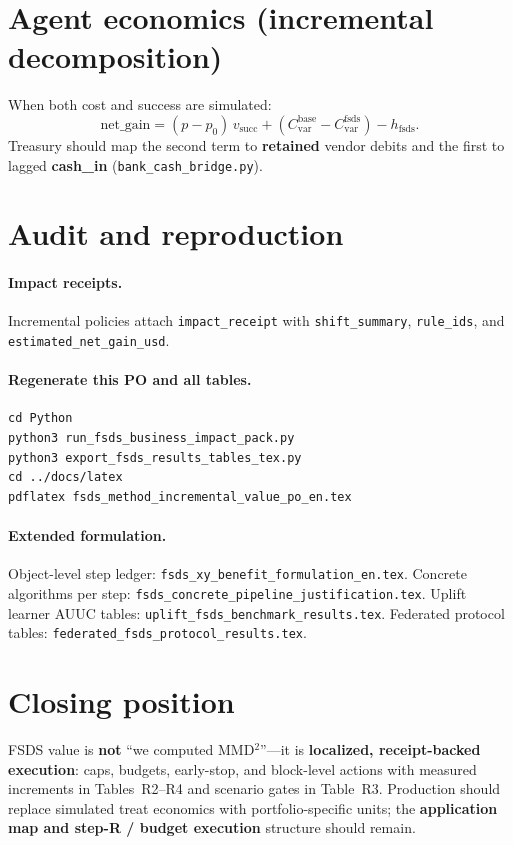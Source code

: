 \documentclass[11pt]{article}
\begin{document}
\section{Agent economics (incremental decomposition)}

When both cost and success are simulated:
\begin{equation}
\label{eq:netgain}
\mathrm{net\_gain}
= (p - p_0)\, v_{\mathrm{succ}}
+ (C^{\mathrm{base}}_{\mathrm{var}} - C^{\mathrm{fsds}}_{\mathrm{var}})
- h_{\mathrm{fsds}}.
\end{equation}
Treasury should map the second term to \textbf{retained} vendor debits and the first to lagged \textbf{cash\_in} (\texttt{bank\_cash\_bridge.py}).

\section{Audit and reproduction}

\paragraph{Impact receipts.}
Incremental policies attach \texttt{impact\_receipt} with \texttt{shift\_summary}, \texttt{rule\_ids}, and \texttt{estimated\_net\_gain\_usd}.

\paragraph{Regenerate this PO and all tables.}
\begin{verbatim}
cd Python
python3 run_fsds_business_impact_pack.py
python3 export_fsds_results_tables_tex.py
cd ../docs/latex
pdflatex fsds_method_incremental_value_po_en.tex
\end{verbatim}

\paragraph{Extended formulation.}
Object-level step ledger: \texttt{fsds\_xy\_benefit\_formulation\_en.tex}.
Concrete algorithms per step: \texttt{fsds\_concrete\_pipeline\_justification.tex}.
Uplift learner AUUC tables: \texttt{uplift\_fsds\_benchmark\_results.tex}.
Federated protocol tables: \texttt{federated\_fsds\_protocol\_results.tex}.

\section*{Closing position}
FSDS value is \textbf{not} ``we computed MMD$^2$''---it is \textbf{localized, receipt-backed execution}: caps, budgets, early-stop, and block-level actions with measured increments in Tables~R2--R4 and scenario gates in Table~R3.
Production should replace simulated treat economics with portfolio-specific units; the \textbf{application map and step-R / budget execution} structure should remain.
\end{document}
